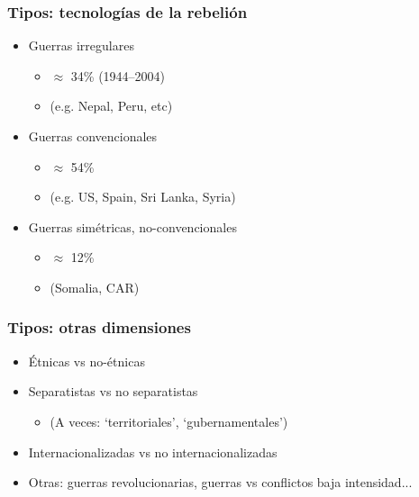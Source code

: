 \begin{frame}
\frametitle{Tipos: tecnologías de la rebelión}
\centering

\begin{itemize}
  \item Guerras irregulares
  \begin{itemize}
    \item[] $\approx$ 34\% (1944--2004)
    \item[] (e.g. Nepal, Peru, etc)
  \end{itemize}
  \item Guerras convencionales
  \begin{itemize}
    \item[] $\approx$ 54\%
    \item[] (e.g. US, Spain, Sri Lanka, Syria)
  \end{itemize}
  \item Guerras simétricas, no-convencionales
  \begin{itemize}
    \item[] $\approx$ 12\%
    \item[] (Somalia, CAR)
  \end{itemize}
\end{itemize}

\end{frame}
\note{}

\begin{frame}
\frametitle{Tipos: otras dimensiones}
\centering

\begin{itemize}
  \item Étnicas vs no-étnicas
  \item Separatistas vs no separatistas 
  \begin{itemize}
    \item[] (A veces: `territoriales', `gubernamentales')
  \end{itemize}
  \item Internacionalizadas vs no internacionalizadas
  \item Otras: guerras revolucionarias, guerras vs conflictos baja intensidad...
\end{itemize}

\end{frame}
\note{}

